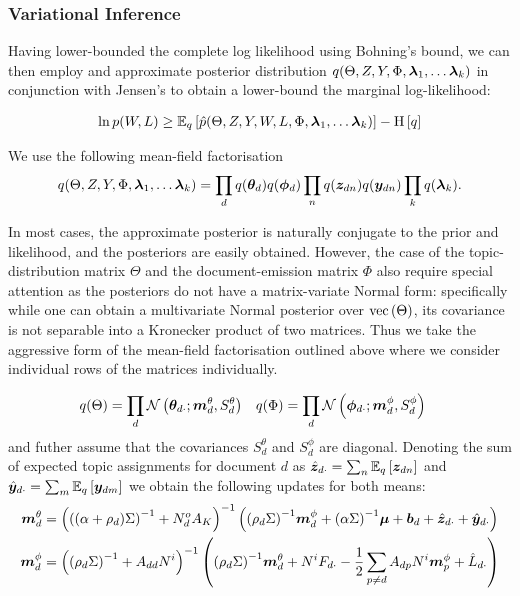 \subsubsection*{Variational Inference}
Having lower-bounded the complete log likelihood using Bohning's bound, we can then employ and approximate posterior distribution $q(\Theta, Z, Y, \Phi, \vv{\lambda}_1, \ldots \vv{\lambda}_k)$ in conjunction with Jensen's to obtain a lower-bound the marginal log-likelihood:

\begin{align}
\ln p(W, L) \geq \ex{\hat{p}(\Theta, Z, Y, W, L, \Phi, \vv{\lambda}_1, \ldots \vv{\lambda}_k)}{q} - \ent{q}
\end{align}

We use the following mean-field factorisation
\begin{align}
q(\Theta, Z, Y, \Phi, \vv{\lambda}_1, \ldots \vv{\lambda}_k) = \prod_d q(\thd)q(\vv{\phi}_d)\prod_n q(\vv{z}_{dn})q(\vv{y}_{dn}) \prod_k q(\vv{\lambda}_k).
\end{align}

In most cases, the approximate posterior is naturally conjugate to the prior and likelihood, and the posteriors are easily obtained. However, the case of the topic-distribution matrix $\Theta$ and the document-emission matrix $\Phi$ also require special attention as the posteriors do not have a matrix-variate Normal form: specifically while one can obtain a multivariate Normal posterior over $\vecf{\Theta}$, its covariance is not separable into a Kronecker product of two matrices. Thus we take the aggressive form of the mean-field factorisation outlined above where we consider individual rows of the matrices individually.

\newcommand \mtd { { \vv{m}^{\theta}_d } }
\newcommand \std { { S^\theta_d } }
\newcommand \mpd { { \vv{m}^{\phi}_d } }
\newcommand \spd { { S^\phi_d } }

\begin{align}
q(\Theta) &= \prod_d \mathcal{N}\left(\thdo; \mtd, \std \right) &
q(\Phi) &= \prod_d \mathcal{N}\left(\phdo; \mpd, \spd\right) 
\end{align}
and futher assume that the covariances $\std$ and $\spd$ are diagonal. Denoting the sum of expected topic assignments for document $d$ as $\hat{\vv{z}}_{d\cdot} = \sum_n \ex{\vv{z}_{dn}}{q}$ and $\hat{\vv{y}}_{d\cdot} = \sum_m \ex{\vv{y}_{dm}}{q}$ we obtain the following updates for both means:
\begin{align}
\mtd &= \invb{ \invb{(\alpha + \rho_d)\Sigma} + N^o_d A_K }
            \left(
                \invb{\rho_d \Sigma} \mpd
                + \invb{\alpha \Sigma}\vv{\mu}
                + \vv{b}_d 
                + \hat{\vv{z}}_{d\cdot}
                + \hat{\vv{y}}_{d\cdot}
            \right) \\
 \mpd & = \invb{\invb{\rho_d \Sigma} + A_{dd}N^i}
             \left(
                 \invb{\rho_d \Sigma}\mtd + N^i F_{d\cdot} -\half \sum_{p \neq d} A_{dp} N^i \vv{m}^\phi_p + \hat{L}_{d\cdot}
             \right)
 \end{align}
 
